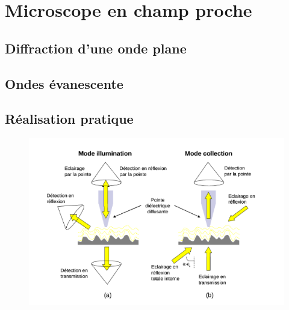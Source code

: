 \documentclass[10pt]{beamer}
\begin{document}
\section{Microscope en champ proche}
\subsection{Diffraction d'une onde plane}
\subsection{Ondes évanescente}
\subsection{Réalisation pratique}
\begin{frame}{\insertsubsection}
    \begin{figure}
        \centering
        \includegraphics[width=1\textwidth]{MicroscopieEnChampProche.png}
    \end{figure}
    
\end{frame}
\end{document}
